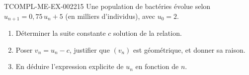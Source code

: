 \begin{exercice}{TCOMPL-ME-EX-002}{2}{15}
Une population de bactéries évolue selon $u_{n+1} = 0{,}75\, u_n + 5$ (en milliers d'individus), avec $u_0=2$.
\begin{enumerate}
  \item Déterminer la suite constante $c$ solution de la relation.
  \item Poser $v_n = u_n - c$, justifier que $(v_n)$ est géométrique, et donner sa raison.
  \item En déduire l'expression explicite de $u_n$ en fonction de $n$.
\end{enumerate}
\end{exercice}
